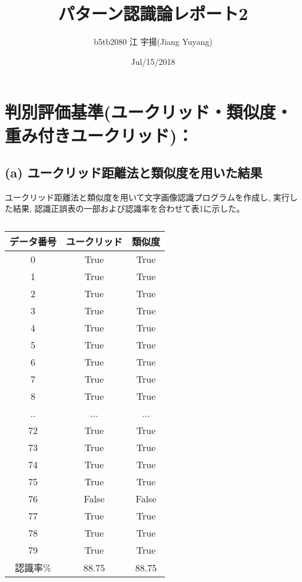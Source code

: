 \documentclass[twocolumn, 10.5pt]{jsarticle}
\title{パターン認識論レポート2}
\date{Jul/15/2018}
\author{b5tb2080 江 宇揚(Jiang Yuyang)}
\begin{document}

\section{判別評価基準(ユークリッド・類似度・重み付きユークリッド)：}
\subsection{(a) ユークリッド距離法と類似度を用いた結果}
ユークリッド距離法と類似度を用いて文字画像認識プログラムを作成し, 実行した結果, 認識正誤表の一部および認識率を合わせて表1に示した。
\begin{table}[hbtp]
  \caption{}
  \centering
  \begin{tabular}{|c||c|c|}\hline
  データ番号 & ユークリッド & 類似度 \\\hline\hline
    0 & True & True \\\hline
    1 & True & True \\\hline
    2 & True & True \\\hline
    3 & True & True \\\hline
    4 & True & True \\\hline
    5 & True & True \\\hline
    6 & True & True \\\hline
    7 & True & True \\\hline
    8 & True & True \\\hline
    .. & ... & ... \\\hline
    72 & True & True \\\hline
    73 & True & True \\\hline
    74 & True & True \\\hline
    75 & True & True \\\hline
    76 & False & False \\\hline
    77 & True & True \\\hline
    78 & True & True \\\hline
    79 & True & True \\\hline\hline
    認識率\% & 88.75 & 88.75 \\\hline
  \end{tabular}
\end{table}
\end{document}
